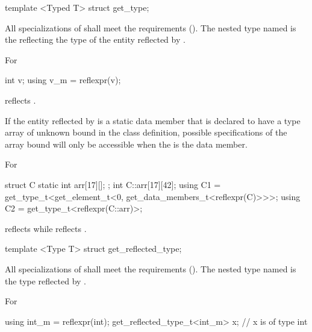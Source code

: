\begin{std.txt}\color{addclr}

\begin{itemdecl}
template <Typed T> struct get_type;
\end{itemdecl}

\begin{itemdescr}
\pnum
All specializations of  shall meet the  requirements (). The nested type named  is the  reflecting the type of the entity reflected by .

\pnum
\begin{example}
For
\begin{codeblock}
int v; using v_m = reflexpr(v);
\end{codeblock}
 reflects .
\end{example}

\pnum
If the entity reflected by  is a static data member that is declared to have a type array of unknown bound in the class definition, possible specifications of the array bound will only be accessible when the  is the data member.

\pnum
\begin{note}
For
\begin{codeblock}
struct C {
   static int arr[17][];
};
int C::arr[17][42];
using C1 = get_type_t<get_element_t<0, get_data_members_t<reflexpr(C)>>>;
using C2 = get_type_t<reflexpr(C::arr)>;
\end{codeblock}
 reflects  while  reflects .
\end{note}

\end{itemdescr}
\begin{itemdecl}
template <Type T> struct get_reflected_type;
\end{itemdecl}

\begin{itemdescr}
\pnum
All specializations of  shall meet the  requirements (). The nested type named  is the type reflected by .

\pnum
\begin{example}
For
\begin{codeblock}
using int_m = reflexpr(int);
get_reflected_type_t<int_m> x; // x is of type int
\end{codeblock}
\end{example}
\end{itemdescr}


\end{std.txt}
